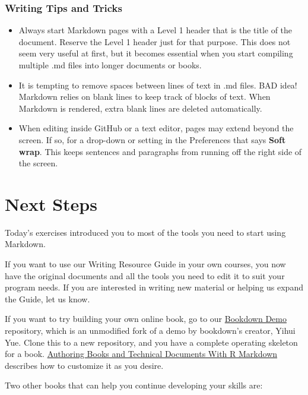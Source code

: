 \documentclass[
]{article}
\providecommand{\tightlist}{%
  \setlength{\itemsep}{0pt}\setlength{\parskip}{0pt}}
\begin{document}
\hypertarget{writing-tips-and-tricks-1}{%
\subsubsection{Writing Tips and
Tricks}\label{writing-tips-and-tricks-1}}

\begin{itemize}
\tightlist
\item
  Always start Markdown pages with a Level 1 header that is the title of
  the document. Reserve the Level 1 header just for that purpose. This
  does not seem very useful at first, but it becomes essential when you
  start compiling multiple .md files into longer documents or books.
\item
  It is tempting to remove spaces between lines of text in .md files.
  BAD idea! Markdown relies on blank lines to keep track of blocks of
  text. When Markdown is rendered, extra blank lines are deleted
  automatically.
\item
  When editing inside GitHub or a text editor, pages may extend beyond
  the screen. If so, for a drop-down or setting in the Preferences that
  says \textbf{Soft wrap}. This keeps sentences and paragraphs from
  running off the right side of the screen.
\end{itemize}

\hypertarget{next-steps}{%
\section{Next Steps}\label{next-steps}}

Today's exercises introduced you to most of the tools you need to start
using Markdown.

If you want to use our Writing Resource Guide in your own courses, you
now have the original documents and all the tools you need to edit it to
suit your program needs. If you are interested in writing new material
or helping us expand the Guide, let us know.

If you want to try building your own online book, go to our
\href{https://github.com/adanieljohnson/bookdown-demo}{Bookdown Demo}
repository, which is an unmodified fork of a demo by bookdown's creator,
Yihui Yue. Clone this to a new repository, and you have a complete
operating skeleton for a book.
\href{https://bookdown.org/yihui/bookdown/}{Authoring Books and
Technical Documents With R Markdown} describes how to customize it as
you desire.

Two other books that can help you continue developing your skills are:
\end{document}
